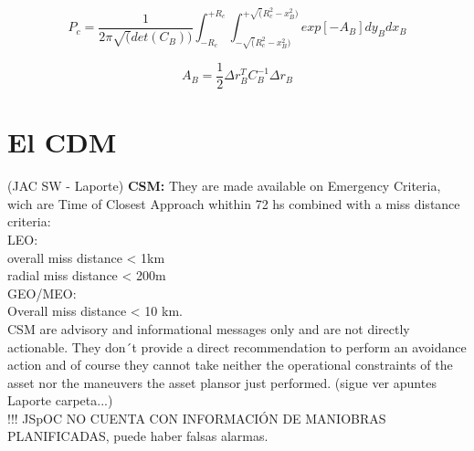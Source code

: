 \begin{equation}
P_{c} = \frac{1}{2 \pi \sqrt(det(C_{B}))} \int_{-R_{c}}^{+R_{c}} \int_{-\sqrt(R^{2}_{c}-x^{2}_{B})}^{+\sqrt(R^{2}_{c}-x^{2}_{B})} exp [- A_{B}] dy_{B} dx_{B}
\end{equation}

\begin{equation}
A_{B}=\frac{1}{2}\Delta r^{T}_{B} C^{-1}_{B} \Delta r_{B}
\end{equation}



\section{El CDM}
(JAC SW - Laporte)
{\bf{CSM:}} They are made available on Emergency Criteria, wich are Time of Closest Approach whithin 72 hs combined with a miss distance criteria:\\
LEO:\\
overall miss distance < 1km\\
radial miss distance < 200m\\
GEO/MEO:\\
Overall miss distance < 10 km.\\

CSM are advisory and informational messages only and are not directly actionable. They don´t provide a direct recommendation to perform an avoidance action and of course they cannot take neither the operational constraints of the asset nor the maneuvers the asset plansor just performed. (sigue ver apuntes Laporte carpeta...)\\

!!! JSpOC NO CUENTA CON INFORMACI\'ON DE MANIOBRAS PLANIFICADAS, puede haber falsas alarmas.\\




